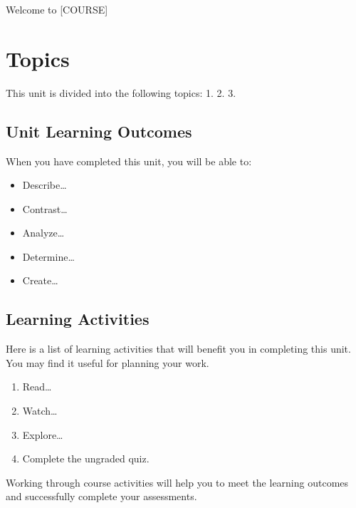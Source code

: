 \documentclass[
  letterpaper,
  DIV=11,
  numbers=noendperiod]{scrreprt}
\providecommand{\tightlist}{%
  \setlength{\itemsep}{0pt}\setlength{\parskip}{0pt}}\usepackage{longtable,booktabs,array}
\begin{document}
Welcome to {[}COURSE{]}

\section*{Topics}\label{topics}


This unit is divided into the following topics: 1. 2. 3.

\subsection*{Unit Learning Outcomes}\label{unit-learning-outcomes}

When you have completed this unit, you will be able to:

\begin{itemize}
\tightlist
\item
  Describe\ldots{}
\item
  Contrast\ldots{}
\item
  Analyze\ldots{}
\item
  Determine\ldots{}
\item
  Create\ldots{}
\end{itemize}

\subsection*{Learning Activities}\label{learning-activities}

Here is a list of learning activities that will benefit you in
completing this unit. You may find it useful for planning your work.

\begin{enumerate}
\def\labelenumi{\arabic{enumi}.}
\tightlist
\item
  Read\ldots{}
\item
  Watch\ldots{}
\item
  Explore\ldots{}
\item
  Complete the ungraded quiz.
\end{enumerate}

\begin{tcolorbox}[enhanced jigsaw, bottomrule=.15mm, colframe=quarto-callout-note-color-frame, arc=.35mm, rightrule=.15mm, opacityback=0, toprule=.15mm, breakable, leftrule=.75mm, left=2mm, colback=white]
\begin{minipage}[t]{5.5mm}
\textcolor{quarto-callout-note-color}{\faInfo}
\end{minipage}%
\begin{minipage}[t]{\textwidth - 5.5mm}

Working through course activities will help you to meet the learning
outcomes and successfully complete your assessments.

\end{minipage}%
\end{tcolorbox}
\end{document}
